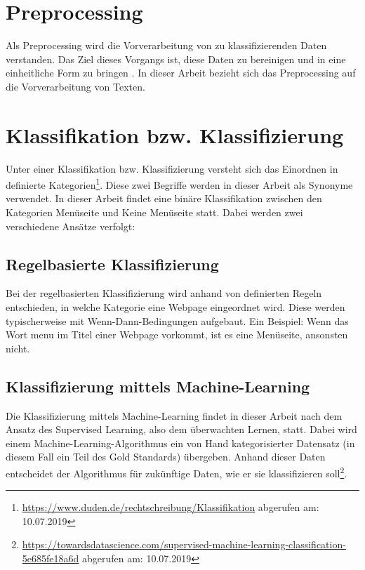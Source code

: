 \section{Preprocessing}
Als Preprocessing wird die Vorverarbeitung von zu klassifizierenden Daten verstanden.
Das Ziel dieses Vorgangs ist, diese Daten zu bereinigen und in eine einheitliche Form zu bringen \cite[p.155]{liu2007web}.
In dieser Arbeit bezieht sich das Preprocessing auf die Vorverarbeitung von Texten.
\section{Klassifikation bzw. Klassifizierung}
Unter einer Klassifikation bzw. Klassifizierung versteht sich das Einordnen in definierte Kategorien\footnote{\url{https://www.duden.de/rechtschreibung/Klassifikation} abgerufen am: 10.07.2019}.
Diese zwei Begriffe werden in dieser Arbeit als Synonyme verwendet.
In dieser Arbeit findet eine binäre Klassifikation zwischen den Kategorien \glqq Menüseite\grqq{} und \glqq Keine Menüseite\grqq{} statt.
Dabei werden zwei verschiedene Ansätze verfolgt:
\subsection{Regelbasierte Klassifizierung}
Bei der regelbasierten Klassifizierung wird anhand von definierten Regeln entschieden, in welche Kategorie eine Webpage eingeordnet wird.
Diese werden typischerweise mit \glqq Wenn-Dann\grqq-Bedingungen aufgebaut\cite[p.125ff]{jackson2007natural}.
Ein Beispiel: Wenn das Wort \glqq menu\grqq{} im Titel einer Webpage vorkommt, ist es eine Menüseite, ansonsten nicht.
\subsection{Klassifizierung mittels Machine-Learning}
Die Klassifizierung mittels Machine-Learning findet in dieser Arbeit nach dem Ansatz des \glqq Supervised Learning\grqq{}, also dem überwachten Lernen, statt.
Dabei wird einem Machine-Learning-Algorithmus ein von Hand kategorisierter Datensatz (in diesem Fall ein Teil des Gold Standards) übergeben.
Anhand dieser Daten entscheidet der Algorithmus für zukünftige Daten, wie er sie klassifizieren soll\footnote{\url{https://towardsdatascience.com/supervised-machine-learning-classification-5e685fe18a6d} abgerufen am: 10.07.2019}.
